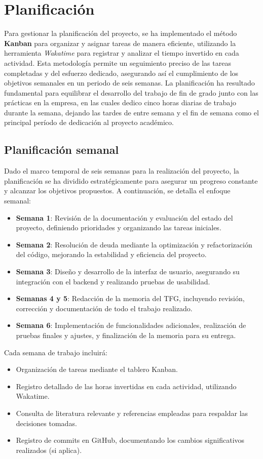 \chapter{Planificación} \label{planificacion}
Para gestionar la planificación del proyecto, se ha implementado el método \textbf{Kanban} para organizar y asignar tareas de manera eficiente, utilizando la herramienta \textit{Wakatime} para registrar y analizar el tiempo invertido en cada actividad. Esta metodología permite un seguimiento preciso de las tareas completadas y del esfuerzo dedicado, asegurando así el cumplimiento de los objetivos semanales en un periodo de seis semanas. La planificación ha resultado fundamental para equilibrar el desarrollo del trabajo de fin de grado junto con las prácticas en la empresa, en las cuales dedico cinco horas diarias de trabajo durante la semana, dejando las tardes de entre semana y el fin de semana como el principal período de dedicación al proyecto académico.

\section{Planificación semanal} 
Dado el marco temporal de seis semanas para la realización del proyecto, la planificación se ha dividido estratégicamente para asegurar un progreso constante y alcanzar los objetivos propuestos. A continuación, se detalla el enfoque semanal:

\begin{itemize} 
    \item \textbf{Semana 1}: Revisión de la documentación y evaluación del estado del proyecto, definiendo prioridades y organizando las tareas iniciales. 
    \item \textbf{Semana 2}: Resolución de \Gls{deuda} mediante la optimización y refactorización del código, mejorando la estabilidad y eficiencia del proyecto. 
    \item \textbf{Semana 3}: Diseño y desarrollo de la interfaz de usuario, asegurando su integración con el backend y realizando pruebas de usabilidad. 
    \item \textbf{Semanas 4 y 5}: Redacción de la memoria del TFG, incluyendo revisión, corrección y documentación de todo el trabajo realizado. 
    \item \textbf{Semana 6}: Implementación de funcionalidades adicionales, realización de pruebas finales y ajustes, y finalización de la memoria para su entrega. 
\end{itemize}
Cada semana de trabajo incluirá: 
\begin{itemize} 
    \item Organización de tareas mediante el tablero Kanban. 
    \item Registro detallado de las horas invertidas en cada actividad, utilizando Wakatime. 
    \item Consulta de literatura relevante y referencias empleadas para respaldar las decisiones tomadas. 
    \item Registro de commits en GitHub, documentando los cambios significativos realizados (si aplica). 
\end{itemize}

